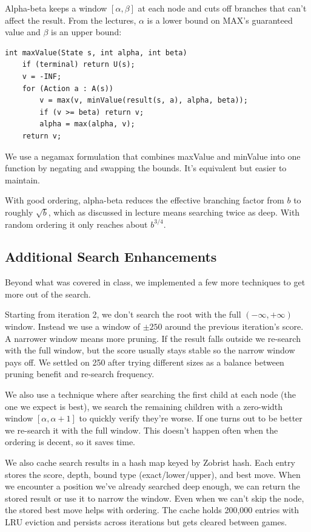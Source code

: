 \documentclass[12pt, letterpaper]{article}
\begin{document}
Alpha-beta keeps a window $[\alpha, \beta]$ at each node and cuts off branches that can't affect the result. From the lectures, $\alpha$ is a lower bound on MAX's guaranteed value and $\beta$ is an upper bound:

\begin{lstlisting}
int maxValue(State s, int alpha, int beta)
    if (terminal) return U(s);
    v = -INF;
    for (Action a : A(s))
        v = max(v, minValue(result(s, a), alpha, beta));
        if (v >= beta) return v;
        alpha = max(alpha, v);
    return v;
\end{lstlisting}

We use a negamax formulation that combines maxValue and minValue into one function by negating and swapping the bounds. It's equivalent but easier to maintain.

With good ordering, alpha-beta reduces the effective branching factor from $b$ to roughly $\sqrt{b}$, which as discussed in lecture means searching twice as deep. With random ordering it only reaches about $b^{3/4}$.

\subsection{Additional Search Enhancements}

Beyond what was covered in class, we implemented a few more techniques to get more out of the search.

Starting from iteration 2, we don't search the root with the full $(-\infty, +\infty)$ window. Instead we use a window of $\pm 250$ around the previous iteration's score. A narrower window means more pruning. If the result falls outside we re-search with the full window, but the score usually stays stable so the narrow window pays off. We settled on 250 after trying different sizes as a balance between pruning benefit and re-search frequency.

We also use a technique where after searching the first child at each node (the one we expect is best), we search the remaining children with a zero-width window $[\alpha, \alpha + 1]$ to quickly verify they're worse. If one turns out to be better we re-search it with the full window. This doesn't happen often when the ordering is decent, so it saves time.

We also cache search results in a hash map keyed by Zobrist hash. Each entry stores the score, depth, bound type (exact/lower/upper), and best move. When we encounter a position we've already searched deep enough, we can return the stored result or use it to narrow the window. Even when we can't skip the node, the stored best move helps with ordering. The cache holds 200,000 entries with LRU eviction and persists across iterations but gets cleared between games.
\end{document}
